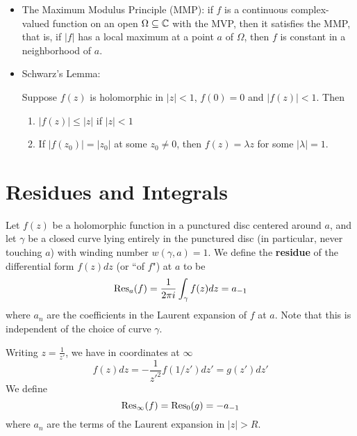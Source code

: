 \documentclass{article}
\begin{document}
\begin{itemize}
  \item The Maximum Modulus Principle (MMP): if \(f\) is a continuous complex-valued function on an open \(\Omega \subseteq \mathbb{C}\) with the MVP, then it satisfies the MMP, that is, if \(|f|\) has a local maximum at a point \(a\) of \(\Omega\), then \(f\) is constant in a neighborhood of \(a\).

  \item Schwarz's Lemma:
  \begin{theorem}
    Suppose \(f(z)\) is holomorphic in \(|z| < 1\), \(f(0) = 0\) and \(|f(z)| < 1\). Then
    \begin{enumerate}

      \item \(|f(z)| \leq |z|\) if \(|z| < 1\)

      \item If \(|f(z_0)| = |z_0|\) at some \(z_0 \neq 0\), then \(f(z) = \lambda z\) for some \(|\lambda| = 1\).

    \end{enumerate}
  \end{theorem}

\end{itemize}

\section{Residues and Integrals}

\begin{definition}[Residue]
Let \(f(z)\) be a holomorphic function in a punctured disc centered around \(a\), and let \(\gamma\) be a closed curve lying entirely in the punctured disc (in particular, never touching \(a\)) with winding number \(w(\gamma, a) = 1\). We define the \textbf{residue} of the differential form \(f(z)dz\) (or ``of \(f\)") at \(a\) to be
\begin{equation}
  \operatorname{Res}_a(f) = \frac{1}{2\pi i}\int_\gamma f(z)dz = a_{-1}
\end{equation}
where \(a_n\) are the coefficients in the Laurent expansion of \(f\) at \(a\). Note that this is independent of the choice of curve \(\gamma\).
\end{definition}

\begin{definition}
  Writing \(z = \frac{1}{z'}\), we have in coordinates at \(\infty\)
  \begin{equation}
    f(z)dz = -\frac{1}{z'^2}f(1/z')dz' = g(z')dz'
  \end{equation}
  We define
  \begin{equation}
    \operatorname{Res}_\infty(f) = \operatorname{Res}_0(g) = -a_{-1}
  \end{equation}
  where \(a_n\) are the terms of the Laurent expansion in \(|z| > R\).
\end{definition}
\end{document}
